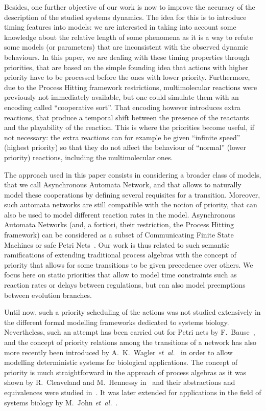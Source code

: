 Besides, one further objective of our work is now %
to improve the accuracy of the description of the studied systems dynamics.
The idea for this is to introduce timing features into models:
we are interested in taking into account some knowledge about the relative length of some phenomena as it is a way to refute some models (or parameters) that are inconsistent with the observed dynamic behaviours.
In this paper, we are dealing with these timing properties through priorities,
that are based on the simple founding idea that actions with higher priority have to be processed before the ones with lower priority.
Furthermore, due to the Process Hitting framework restrictions, multimolecular reactions were previously not immediately available, but one could simulate them with an encoding called “cooperative sort”.
That encoding however introduces extra reactions,
that produce a temporal shift between the presence of the reactants
and the playability of the reaction.
This is where the priorities become useful, if not necessary:
the extra reactions can for example be given “infinite speed” (highest priority) so that they do not affect the behaviour of “normal” (lower priority) reactions, including the multimolecular ones.

The approach used in this paper
consists in considering a broader class of models,
that we call Asynchronous Automata Network,
and that allows to naturally model these cooperations
by defining several requisites for a transition.
Moreover, such automata networks are still compatible with the notion of priority,
that can also be used to model different reaction rates in the model.
Asynchronous Automata Networks
(and, a fortiori, their restriction, the Process Hitting framework)
can be considered as a subset of Communicating Finite State Machines
or safe Petri Nets~\cite{PMR-PetriNets}.
Our work is thus related to such semantic ramifications
of extending traditional process algebras with the concept of priority
that allows for some transitions to be given precedence over others.
We focus here on static priorities that allow to model
time constraints such as reaction rates or delays between regulations,
but can also model preemptions between evolution branches.

Until now, such a priority scheduling of the actions was not studied extensively in the different formal modelling frameworks dedicated to systems biology.
Nevertheless, such an attempt has been carried out for Petri nets by F.~Bause~\cite{Bause97},
and the concept of priority relations among the transitions of a network has also more recently been introduced by A.~K.~Wagler \textit{et~al.}~\cite{waw,WaglerW12} in order to allow modelling deterministic systems for biological applications.
The concept of priority is much straightforward in the approach of process algebras as it was shown by R.~Cleaveland and M.~Hennessy in~\cite{Cleaveland199058} and their abstractions and equivalences were studied in~\cite{Cleaveland:2007:PAP:1282576.1282847}.
It was later extended for applications in the field of systems biology by M.~John \textit{et~al.}~\cite{jlnu2010}.

